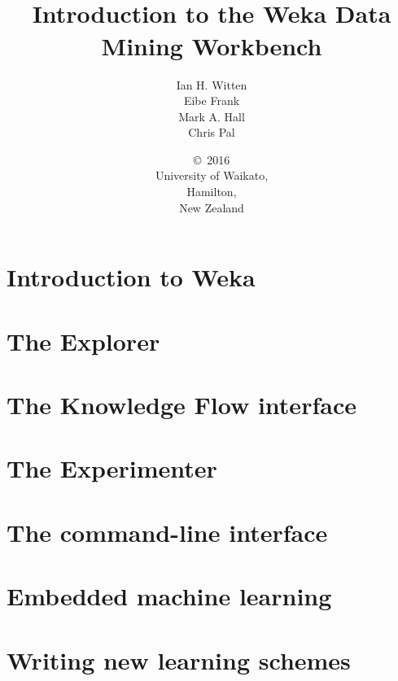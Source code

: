 \documentclass[a4paper]{book}
\title{\epsfig{file=images/coat_of_arms.eps,width=10cm}\vspace{3cm}\\Introduction to the Weka Data Mining Workbench}
\author{Ian H. Witten\\Eibe Frank\\Mark A. Hall\\Chris Pal}
\date{\copyright\ 2016\\University of Waikato,\\Hamilton,\\New Zealand}
\begin{document}
\begin{titlepage}
\maketitle



\end{titlepage}

\tableofcontents

\chapter{Introduction to Weka}


\chapter{The Explorer}
\label{chapt:explorer}


\chapter{The Knowledge Flow interface}
\label{chapt:knowledge_flow}


\chapter{The Experimenter}
\label{chapt:experimenter}


\chapter{The command-line interface}
\label{chapt:command_line}


\chapter{Embedded machine learning}
\label{chapt:embedded}


\chapter{Writing new learning schemes}
\label{chapt:writing_learning_schemes}

\end{document}
